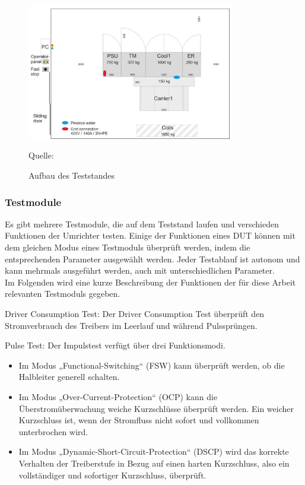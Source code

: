 \begin{figure}[h]
    \centering
    \includegraphics[width=0.8\textwidth]{Grafiken/Test Cabin.jpg}
    \caption{Aufbau des Teststandes}
    \label{fig:1. Aufbau des Teststandes}
    {Quelle: \cite*[7]{Main_Manuel_USTB2018}}
\end{figure}


\subsubsection{Testmodule}
Es gibt mehrere Testmodule, die auf dem Teststand laufen und verschieden Funktionen der Umrichter testen.
Einige der Funktionen eines DUT können mit dem gleichen Modus eines Testmoduls überprüft werden, indem die
entsprechenden Parameter ausgewählt werden.
Jeder Testablauf ist autonom und kann mehrmals ausgeführt werden, auch mit unterschiedlichen Parameter.
\\
Im Folgenden wird eine kurze Beschreibung der Funktionen der für diese Arbeit relevanten Testmoduls gegeben.

Driver Consumption Test:
Der Driver Consumption Test überprüft den Stromverbrauch des Treibers im Leerlauf und während Pulssprüngen.

Pulse Test:
Der Impulstest verfügt über drei Funktionsmodi.
\begin{itemize}
    \item Im Modus „Functional-Switching“ (FSW) kann überprüft werden, ob die Halbleiter generell schalten.
    \item Im Modus „Over-Current-Protection“ (OCP) kann die Überstromüberwachung weiche Kurzschlüsse überprüft werden.
    Ein weicher Kurzschluss ist, wenn der Stromfluss nicht sofort und vollkommen unterbrochen wird.
    \item Im Modus „Dynamic-Short-Circuit-Protection“ (DSCP) wird das korrekte Verhalten der Treiberstufe in Bezug auf
    einen harten Kurzschluss, also ein vollständiger und sofortiger Kurzschluss, überprüft.
\end{itemize}


